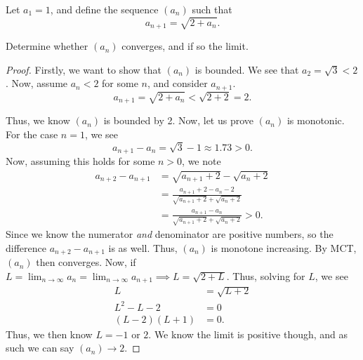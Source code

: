 \setcounter{enumi}{3} %
\item Let $a_{1} = 1$, and define the sequence $(a_{n})$ such that
\[
  a_{n + 1} = \sqrt{2 + a_{n}}.
\]

Determine whether $(a_{n})$ converges, and if so the limit.

\begin{proof}
  Firstly, we want to show that $(a_{n})$ is bounded.
  We see that $a_{2} = \sqrt{3} < 2$. Now, assume $a_{n} < 2$ for some $n$, and consider $a_{n + 1}$.
  \[
    a_{n + 1} = \sqrt{2 + a_{n}} < \sqrt{2 + 2} = 2.
  \]

  Thus, we know $(a_{n})$ is bounded by 2. Now, let us prove $(a_{n})$ is monotonic.
  For the case $n = 1$, we see
  \[
    a_{n + 1} - a_{n} = \sqrt{3} - 1 \approx 1.73 > 0.
  \]
  Now, assuming this holds for some $n > 0$, we note
  \begin{align*}
    a_{n + 2} - a_{n + 1} &= \sqrt{a_{n + 1} + 2} - \sqrt{a_{n} + 2}\\
    &= \frac{a_{n + 1} + 2 - a_{n} - 2}
      {\sqrt{a_{n + 1} + 2} + \sqrt{a_{n} + 2}}\\
    &= \frac{a_{n + 1} - a_{n}}{\sqrt{a_{n + 1} + 2} + \sqrt{a_{n} + 2}} > 0.
  \end{align*}
  Since we know the numerator \emph{and} denominator are positive numbers, so the difference $a_{n + 2} - a_{n + 1}$ is as well.
  Thus, $(a_{n})$ is monotone increasing. By MCT, $(a_{n})$ then converges.
  Now, if $L = \lim_{n \to \infty} a_{n} = \lim_{n \to \infty}a_{n + 1} \implies L = \sqrt{2 + L}$.
  Thus, solving for $L$, we see
  \begin{align*}
    L &= \sqrt{L + 2}\\
    L^{2} -L - 2 &= 0\\
    (L - 2)(L + 1) &= 0.
  \end{align*}
  Thus, we then know $L = -1$ or $2$. We know the limit is positive though, and as such we can say $(a_{n}) \to 2$.
\end{proof}
